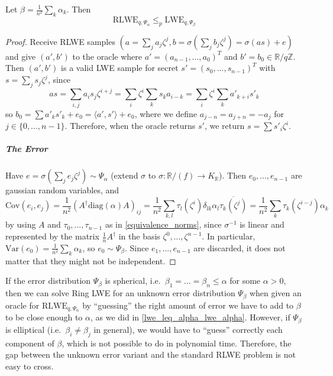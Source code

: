\documentclass{report}
\newcommand{\Z}{\mathbb{Z}}
\newcommand{\R}{\mathbb{R}}
\begin{document}
\label{rlwe_to_lwe_reduction}
Let $\beta = \frac 1 {n^2} \sum_k \alpha_k$. Then
\begin{equation}
\mathrm{RLWE}_{q, \Psi_\alpha} \leq_p \mathrm{LWE}_{q, \Psi_\beta} \nonumber
\end{equation}

\begin{proof}
Receive RLWE samples $(a = \sum_j a_j \zeta^j, b = \sigma(\sum_j b_j \zeta^j) = \sigma(as) + e)$ and give $(a', b')$ to the oracle where $a' = (a_{n - 1}, ..., a_0)^T$ and $b' = b_0 \in \R / q\Z$. Then $(a', b')$ is a valid LWE sample for secret $s' = (s_0, ..., s_{n - 1})^T$ with $s = \sum_j s_j \zeta^j$, since 
\begin{equation}
as = \sum_{i, j} a_i s_j \zeta^{i + j} = \sum_i \zeta^i \sum_k s_k a_{i - k} = \sum_i \zeta^i \sum_k a'_{k + i} s'_k \nonumber
\end{equation}
so $b_0 = \sum a'_k s'_k + e_0 = \langle a', s' \rangle + e_0$, where we define $a_{j - n} = a_{j + n} = -a_j$ for $j \in \{ 0, ..., n - 1 \}$. Therefore, when the oracle returns $s'$, we return $s = \sum s'_i \zeta^i$.

\subparagraph{The Error} Have $e = \sigma\left(\sum_j e_j \zeta^j\right) \sim \Psi_\alpha$ (extend $\sigma$ to $\sigma: \R/(f) \to K_\R$). Then $e_0, ..., e_{n - 1}$ are gaussian random variables, and
\begin{equation}
\mathrm{Cov}(e_i, e_j) = \frac 1 {n^2} \left(A^\dagger \mathrm{diag}(\alpha) A\right)_{ij} = \frac 1 {n^2} \sum_{k, l} \tau_l\left(\zeta^i\right) \delta_{lk} \alpha_l \overline{\tau_k\left(\zeta^j\right)} = \frac 1 {n^2} \sum_k \tau_k\left(\zeta^{i - j}\right) \alpha_k \nonumber
\end{equation}
by using $A$ and $\tau_0, ..., \tau_{n - 1}$ as in \ref{equivalence_norms}, since $\sigma^{-1}$ is linear and represented by the matrix $\frac 1 n A^\dagger$ in the basis $\zeta^0, ..., \zeta^{n - 1}$. In particular, $\mathrm{Var}(e_0) = \frac 1 {n^2} \sum_k \alpha_k$, so $e_0 \sim \Psi_\beta$. Since $e_1, ..., e_{n - 1}$ are discarded, it does not matter that they might not be independent. \qedhere
\end{proof}

If the error distribution $\Psi_\beta$ is spherical, i.e.\ $\beta_1 = ... = \beta_n \leq \alpha$ for some $\alpha > 0$, then we can solve Ring LWE for an unknown error distribution $\Psi_\beta$ when given an oracle for $\mathrm{RLWE}_{q, \Psi_\alpha}$ by ``guessing'' the right amount of error we have to add to $\beta$ to be close enough to $\alpha$, as we did in \ref{lwe_leq_alpha_lwe_alpha}. However, if $\Psi_\beta$ is elliptical (i.e.\ $\beta_i \neq \beta_j$ in general), we would have to ``guess'' correctly each component of $\beta$, which is not possible to do in polynomial time. Therefore, the gap between the unknown error variant and the standard RLWE problem is not easy to cross. 
\end{document}
